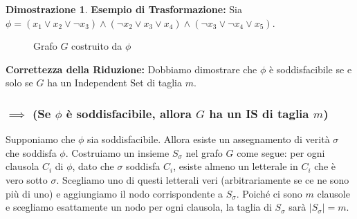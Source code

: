 \documentclass[a4paper]{article}
\theoremstyle{definition} %
\theoremstyle{definition} %
\newtheorem*{proof*}{Dimostrazione}
\begin{document}
\begin{proof*}
\textbf{Esempio di Trasformazione:}
Sia $\phi = (x_1 \lor x_2 \lor \neg x_3) \land (\neg x_2 \lor x_3 \lor x_4) \land (\neg x_3 \lor \neg x_4 \lor x_5)$.
\begin{figure}[h]
    \centering
    \caption{Grafo $G$ costruito da $\phi$}
    \label{fig:is_reduction_graph}
\end{figure}

\textbf{Correttezza della Riduzione:}
Dobbiamo dimostrare che $\phi$ è soddisfacibile se e solo se $G$ ha un Independent Set di taglia $m$.

\subsubsection{$\implies$ (Se $\phi$ è soddisfacibile, allora $G$ ha un IS di taglia $m$)}
Supponiamo che $\phi$ sia soddisfacibile. Allora esiste un assegnamento di verità $\sigma$ che soddisfa $\phi$.
Costruiamo un insieme $S_\sigma$ nel grafo $G$ come segue: per ogni clausola $C_i$ di $\phi$, dato che $\sigma$ soddisfa $C_i$, esiste almeno un letterale in $C_i$ che è vero sotto $\sigma$. Scegliamo uno di questi letterali veri (arbitrariamente se ce ne sono più di uno) e aggiungiamo il nodo corrispondente a $S_\sigma$.
Poiché ci sono $m$ clausole e scegliamo esattamente un nodo per ogni clausola, la taglia di $S_\sigma$ sarà $|S_\sigma|=m$.


\end{proof*}
\end{document}
